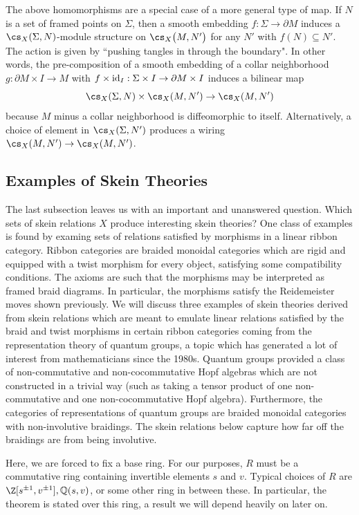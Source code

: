The above homomorphisms are a special case of a more general type of map. If $N$ is a set of framed points on $\Sigma$, then a smooth embedding $f: \Sigma \to \partial M$ induces a $\cs_X(\Sigma, N)$-module structure on $\cs_X\big(M, N'\big)$ for any $N'$ with $f(N) \subseteq N'$. The action is given by ``pushing tangles in through the boundary". In other words, the pre-composition of a smooth embedding of a collar neighborhood $g: \partial M \times I \to M$ with $f \times {\rm{id}}_I: \Sigma\times I \to \partial M \times I$ induces a bilinear map
\[
\cs_X(\Sigma, N) \times \cs_X(M, N') \to \cs_X(M, N')
\]
because $M$ minus a collar neighborhood is diffeomorphic to itself. Alternatively, a choice of element in $\cs_X(\Sigma, N')$ produces a wiring $\cs_X(M, N') \to \cs_X(M, N')$.


\subsection{Examples of Skein Theories}

The last subsection leaves us with an important and unanswered question. Which sets of skein relations $X$ produce interesting skein theories? One class of examples is found by examing sets of relations satisfied by morphisms in a linear ribbon category. Ribbon categories are braided monoidal categories which are rigid and equipped with a twist morphism for every object, satisfying some compatibility conditions. The axioms are such that the morphisms may be interpreted as framed braid diagrams. In particular, the morphisms satisfy the Reidemeister moves shown previously. We will discuss three examples of skein theories derived from skein relations which are meant to emulate linear relations satisfied by the braid and twist morphisms in certain ribbon categories coming from the representation theory of quantum groups, a topic which has generated a lot of interest from mathematicians since the 1980s. Quantum groups provided a class of non-commutative and non-cocommutative Hopf algebras which are not constructed in a trivial way (such as taking a tensor product of one non-commutative and one non-cocommutative Hopf algebra). Furthermore, the categories of representations of quantum groups are braided monoidal categories with non-involutive braidings. The skein relations below capture how far off the braidings are from being involutive.  

Here, we are forced to fix a base ring. For our purposes, $R$ must be a commutative ring containing invertible elements $s$ and $v$. Typical choices of $R$ are $\Z[s^{\pm 1}, v^{\pm 1}], \Q(s, v)$, or some other ring in between these.  In particular, the theorem  is stated over this ring, a result we will depend heavily on later on. \\

